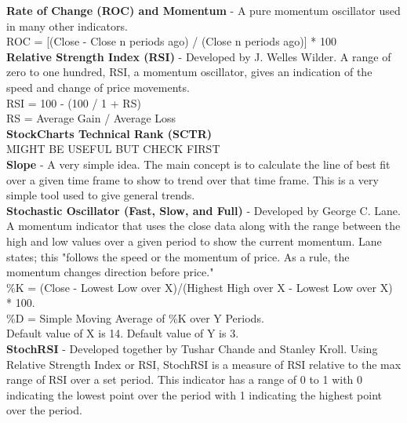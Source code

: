 \documentclass[12pt,a4paper]{article}
\begin{document}
\iffalse
[]
\fi

\noindent
\textbf{Rate of Change (ROC) and Momentum} - A pure momentum oscillator used in many other indicators.\\

\noindent
ROC = [(Close - Close n periods ago) / (Close n periods ago)] * 100 \\

\iffalse
[]
\fi

\noindent
\textbf{Relative Strength Index (RSI)} - Developed by J. Welles Wilder. A range of zero to one hundred, RSI, a momentum oscillator, gives an indication of the speed and change of price movements.\\

\noindent
RSI = 100 - (100 / 1 + RS) \\
RS = Average Gain / Average Loss\\

\iffalse
[]
\fi

\noindent
\textbf{StockCharts Technical Rank (SCTR)} \\

MIGHT BE USEFUL BUT CHECK FIRST\\

\iffalse
[]
\fi

\noindent
\textbf{Slope} - A very simple idea. The main concept is to calculate the line of best fit over a given time frame to show to trend over that time frame. This is a very simple tool used to give general trends.\\

\iffalse
[]
\fi

\noindent
\textbf{Stochastic Oscillator (Fast, Slow, and Full)} - Developed by George C. Lane. A momentum indicator that uses the close data along with the range between the high and low values over a given period to show the current momentum. Lane states; this "follows the speed or the momentum of price. As a rule, the momentum changes direction before price." \\

\noindent
\%K = (Close - Lowest Low over X)/(Highest High over X - Lowest Low over X) * 100.\\
\%D = Simple Moving Average of \%K over Y Periods. \\
Default value of X is 14. Default value of Y is 3.\\

\iffalse
[]
\fi

\noindent
\textbf{StochRSI} - Developed together by Tushar Chande and Stanley Kroll. Using Relative Strength Index or RSI, StochRSI is a measure of RSI relative to the max range of RSI over a set period. This indicator has a range of 0 to 1 with 0 indicating the lowest point over the period with 1 indicating the highest point over the period.\\
\end{document}
